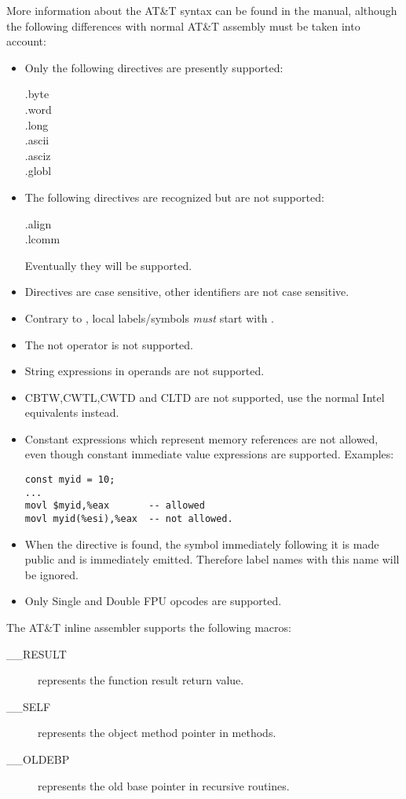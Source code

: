 More information about the AT\&T syntax can be found in the  manual,
although the following differences with normal AT\&T assembly must be taken
into account:
\begin{itemize}
\item Only the following directives are presently supported:
 \begin{description}
\item[.byte]
\item[.word]
\item[.long]
\item[.ascii]
\item[.asciz]
\item[.globl]
\end{description}
\item The following directives are recognized but are not supported:
\begin{description}
\item[.align]
\item[.lcomm]
\end{description}
Eventually they will be supported.
\item Directives are case sensitive, other identifiers are not case sensitive.
\item Contrary to , local labels/symbols {\em must} start with .
\item The not operator  is not supported.
\item String expressions in operands are not supported.
\item CBTW,CWTL,CWTD and CLTD are not supported, use the normal Intel
equivalents instead.
\item Constant expressions which represent memory references are not
allowed, even though constant immediate value expressions are supported.
Examples:
\begin{verbatim}
const myid = 10;
...
movl $myid,%eax       -- allowed
movl myid(%esi),%eax  -- not allowed.
\end{verbatim}
\item When the  directive is found, the symbol immediately following
it is made public and is immediately emitted.
Therefore label names with this name will be ignored.
\item Only Single and Double FPU opcodes are supported.
\end{itemize}

The AT\&T inline assembler supports the following macros:
\begin{description}
\item [\_\_RESULT] represents the function result return value.
\item [\_\_SELF]   represents the object method pointer in methods.
\item [\_\_OLDEBP] represents the old base pointer in recursive routines.
\end{description}

